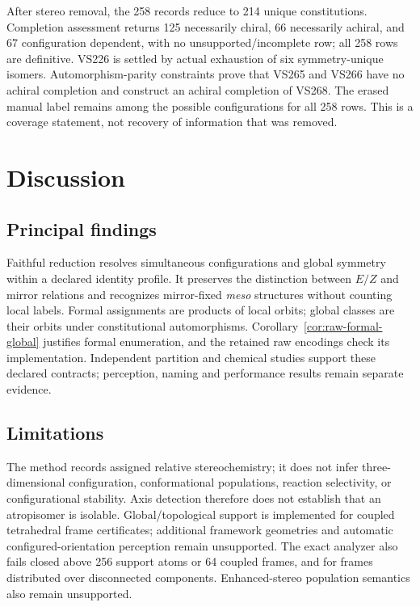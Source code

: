 \documentclass[pdflatex,sn-mathphys-num,referee,lineno]{sn-jnl}
\theoremstyle{plain}
\theoremstyle{remark}
\theoremstyle{definition}
\begin{document}
After stereo removal, the 258 records reduce to 214 unique constitutions.
Completion assessment returns 125 necessarily chiral, 66 necessarily achiral,
and 67 configuration dependent, with no unsupported/incomplete row; all 258
rows are definitive.  VS226 is settled by actual exhaustion of six
symmetry-unique isomers.  Automorphism-parity constraints prove that VS265 and
VS266 have no achiral completion and construct an achiral completion of VS268.
The erased manual label remains among the possible configurations for all 258
rows.  This is a coverage statement, not recovery of information that was
removed.

\section{Discussion}
\label{sec:conclusion}

\subsection{Principal findings}

Faithful reduction resolves simultaneous configurations and global symmetry
within a declared identity profile. It preserves the distinction between
\(E/Z\) and mirror relations and recognizes mirror-fixed \emph{meso}
structures without counting local labels. Formal assignments are products of
local orbits; global classes are their orbits under constitutional
automorphisms. Corollary~\ref{cor:raw-formal-global} justifies formal
enumeration, and the retained raw encodings check its implementation.
Independent partition and chemical studies support these declared contracts;
perception, naming and performance results remain separate evidence.

\subsection{Limitations}

The method records assigned relative stereochemistry; it does not infer
three-dimensional configuration, conformational populations, reaction
selectivity, or configurational stability.  Axis detection therefore does not
establish that an atropisomer is isolable.  Global/topological support is
implemented for coupled tetrahedral frame certificates; additional framework
geometries and automatic configured-orientation perception remain unsupported.
The exact analyzer also fails closed above 256 support atoms or 64 coupled
frames, and for frames distributed over disconnected components.
Enhanced-stereo population semantics also remain unsupported.
\end{document}
